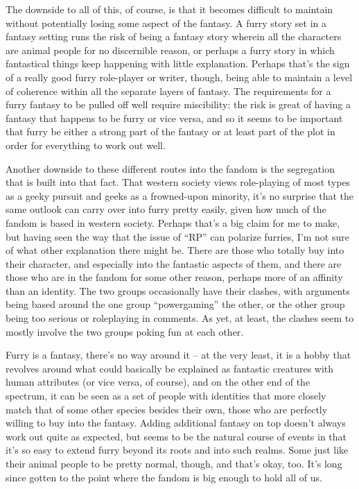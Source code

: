The downside to all of this, of course, is that it becomes difficult to maintain without potentially losing some aspect of the fantasy.  A furry story set in a fantasy setting runs the risk of being a fantasy story wherein all the characters are animal people for no discernible reason, or perhaps a furry story in which fantastical things keep happening with little explanation.  Perhaps that's the sign of a really good furry role-player or writer, though, being able to maintain a level of coherence within all the separate layers of fantasy.  The requirements for a furry fantasy to be pulled off well require miscibility: the risk is great of having a fantasy that happens to be furry or vice versa, and so it seems to be important that furry be either a strong part of the fantasy or at least part of the plot in order for everything to work out well.

Another downside to these different routes into the fandom is the segregation that is built into that fact.  That western society views role-playing of most types as a geeky pursuit and geeks as a frowned-upon minority, it's no surprise that the same outlook can carry over into furry pretty easily, given how much of the fandom is based in western society.  Perhaps that's a big claim for me to make, but having seen the way that the issue of ``RP'' can polarize furries, I'm not sure of what other explanation there might be.  There are those who totally buy into their character, and especially into the fantastic aspects of them, and there are those who are in the fandom for some other reason, perhaps more of an affinity than an identity.  The two groups occasionally have their clashes, with arguments being based around the one group ``powergaming'' the other, or the other group being too serious or roleplaying in comments.  As yet, at least, the clashes seem to mostly involve the two groups poking fun at each other.

Furry is a fantasy, there's no way around it -- at the very least, it is a hobby that revolves around what could basically be explained as fantastic creatures with human attributes (or vice versa, of course), and on the other end of the spectrum, it can be seen as a set of people with identities that more closely match that of some other species besides their own, those who are perfectly willing to buy into the fantasy.  Adding additional fantasy on top doesn't always work out quite as expected, but seems to be the natural course of events in that it's so easy to extend furry beyond its roots and into such realms.  Some just like their animal people to be pretty normal, though, and that's okay, too.  It's long since gotten to the point where the fandom is big enough to hold all of us.

